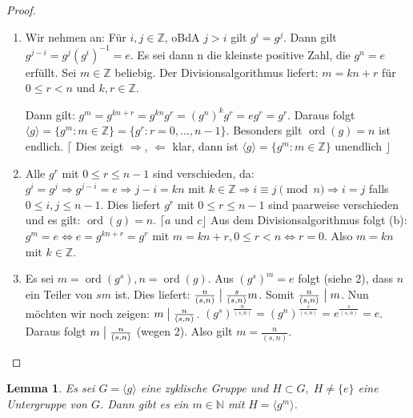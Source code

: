 \documentclass[12pt]{scrartcl} %
\DeclareMathOperator{\ord}{ord}
\newcommand{\divides}{\mathrel{\bigm|}}
\newtheorem{lemma}{Lemma}
\theoremstyle{definition}
\theoremstyle{remark}
\begin{document}
\begin{proof} %
	\begin{enumerate}
		\item Wir nehmen an: Für $i,j \in \mathbb{Z}$, oBdA $j>i$ gilt $g^{i}=g^{j}$.
		Dann gilt $g^{j-i}=g^{j}(g^{i})^{-1}=e$.
		Es sei dann n die kleinste positive Zahl, die $g^{n}=e$ erfüllt.
		Sei $m \in \mathbb{Z}$ beliebig.
		Der Divisionsalgorithmus liefert: $m=kn+r$ für $0 \leq r < n$ und $k,r \in \mathbb{Z}$.

		Dann gilt:
		$g^{m}=g^{kn+r}=g^{kn}g^{r}=(g^{n})^{k}g^{r}=eg^{r}=g^{r}$.
		Daraus folgt $\langle g \rangle = \lbrace g^{m} : m \in \mathbb{Z}\rbrace = \lbrace g^{r} : r=0,\dots,n-1\rbrace$.
		Besonders gilt $\ord(g)=n$ ist endlich.
		$\lceil$ Dies zeigt $\Rightarrow$, $\Leftarrow$ klar, dann ist $\langle g \rangle = \lbrace g^{m} : m \in \mathbb{Z}\rbrace$ unendlich $\rfloor$
		\item Alle $g^{r}$ mit $0 \leq r \leq n-1$ sind verschieden, da:
		$g^{i}=g^{j} \Rightarrow g^{j-i}=e \Rightarrow j-i = kn$ mit $k\in\mathbb{Z} \Rightarrow i \equiv j \pmod{n} \Rightarrow i=j$ falls $0\leq i,j\leq n-1$.
		Dies liefert $g^{r}$ mit $0 \leq r \leq n-1$ sind paarweise verschieden und es gilt: $\ord(g)=n$. $\lceil a$ und $c\rfloor$
		Aus dem Divisionsalgorithmus folgt (b): $g^{m}=e \Leftrightarrow e=g^{kn+r}=g^{r}$ mit $m = kn+r, 0 \leq r < n \Leftrightarrow r=0$.
		Also $m=kn$ mit $k \in \mathbb{Z}$. %
		\item Es sei $m=\ord(g^{s}), n =\ord(g)$.
		Aus $(g^{s})^{m}=e$ folgt (siehe 2), dass $n$ ein Teiler von $sm$ ist.
		Dies liefert: $\frac{n}{(s,n)} \divides \frac{s}{(s,n)}m$. Somit $\frac{n}{(s,n)} \divides m$.
		Nun möchten wir noch zeigen: $m \divides \frac{n}{(s,n)}$. $(g^{s})^{\frac{n}{(s,n)}} = (g^{n})^{\frac{s}{(s,n)}}=e^{\frac{s}{(s,n)}}=e$.
		Daraus folgt $m \divides \frac{n}{(s,n)}$ (wegen 2).
		Also gilt $m = \frac{n}{(s,n)}$. \qedhere
	\end{enumerate}
\end{proof}

\begin{lemma}
        Es sei $G = \langle g \rangle$ eine zyklische Gruppe und $H \subset G,\; H\neq\{e\}$ eine Untergruppe von $G$. %
	Dann gibt es ein $m\in\mathbb{N}$ mit $H=\langle g^m\rangle$.
\end{lemma}
\end{document}
